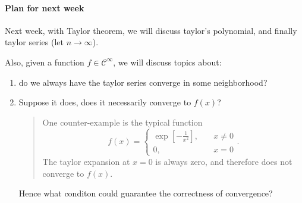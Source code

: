 \paragraph{Plan for next week}

Next week, with Taylor theorem, we will discuss taylor's polynomial, and finally taylor series (let $n\to\infty$).

Also, given a function $f\in\mathcal{C}^\infty$, we will discuss topics about:
\begin{enumerate}
\item
do we always have the taylor series converge in some neighborhood?
\item
Suppose it does, does it necessarily converge to $f(x)$?
\begin{quotation}
One counter-example is the typical function
\[
f(x)=\left\{
\begin{aligned}
\exp\left[-\frac{1}{x^2}\right],&\quad x\ne0\\
0,&\quad x=0
\end{aligned}
\right..
\]
The taylor expansion at $x=0$ is always zero, and therefore does not converge to $f(x)$.
\end{quotation}
Hence what conditon could guarantee the correctness of convergence?
\end{enumerate}







